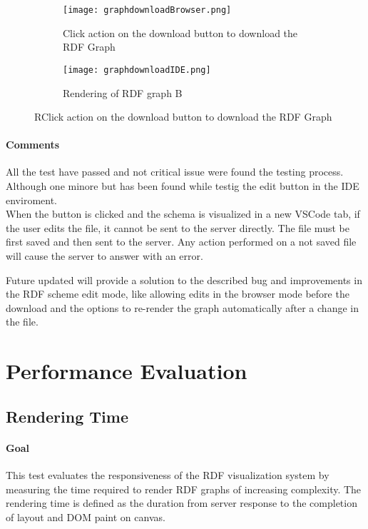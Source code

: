 \begin{figure}[H]
    \centering
    \begin{subfigure}[b]{0.48\textwidth}
        \centering
        \texttt{[image: graphdownloadBrowser.png]}
        \caption{Click action on the download button to download the RDF Graph}
        \label{fig:graphdownloadA}
    \end{subfigure}
    \hfill
    \begin{subfigure}[b]{0.48\textwidth}
        \centering
        \texttt{[image: graphdownloadIDE.png]}
        \caption{Rendering of RDF graph B}
        \label{fig:graphdownloadB}
    \end{subfigure}
    \caption{RClick action on the download button to download the RDF Graph}
    \label{fig:graphdownloadfrombrowsersandIDE}
\end{figure}


\paragraph{Comments}
All the test have passed and not critical issue were found the testing process.
Although one minore but has been found while testig the edit button in the IDE enviroment. 
\\
When the button is clicked and the schema is visualized in a new VSCode tab, if the user edits the file, it cannot be sent to the server directly. 
The file must be first saved and then sent to the server. Any action performed on a not saved file will cause the server to answer with an error. 

Future updated will provide a solution to the described bug and improvements in the RDF scheme edit mode, like allowing edits in the browser mode before the download and the options to re-render the graph automatically after a change in the file. 

\section{Performance Evaluation}
\subsection{Rendering Time}

\paragraph{Goal}
This test evaluates the responsiveness of the RDF visualization system by measuring the time required to render RDF graphs of increasing complexity. The rendering time is defined as the duration from server response to the completion of layout and DOM paint on canvas.

